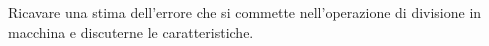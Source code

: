 Ricavare una stima dell'errore che si commette nell'operazione di 
divisione in macchina e discuterne le caratteristiche.
